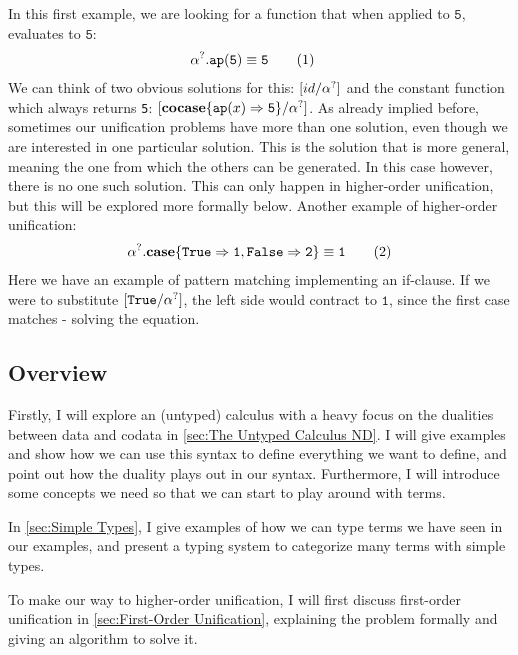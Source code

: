 \documentclass[twoside,12pt,a4paper]{article}
\begin{document}
\begin{example}\label{sec:mgu}
    In this first example, we are looking for a function that when applied to $\mathtt{5}$, evaluates to $\mathtt{5}$:
    \begin{align*}
        &\alpha^?.\texttt{ap}(\mathtt{5}) \equiv \mathtt{5}\tag{1} 
    \end{align*}
    We can think of two obvious solutions for this: $[id / \alpha^?]$ and the constant function which always returns \texttt{5}: $[\textbf{cocase}\{\texttt{ap}(x)\Rightarrow \mathtt{5}\} / \alpha^?]$.
    As already implied before, sometimes our unification problems have more than one solution, 
    even though we are interested in one particular solution. This is the solution that is more general, meaning the one from which the others can be generated.
    In this case however, there is no one such solution. This can only happen in higher-order unification, but this will be explored more formally below.
    Another example of higher-order unification:
    \begin{align*}
    \alpha^?.\textbf{case}\{\mathtt{True \Rightarrow 1, False \Rightarrow 2}\}\equiv \mathtt{1} \tag{2}
    \end{align*}
    Here we have an example of pattern matching implementing an if-clause.
    If we were to substitute $[\mathtt{True / \alpha^?}]$, the left side would contract to $\mathtt{1}$,
    since the first case matches - solving the equation.
\end{example}

\subsection{Overview}

Firstly, I will explore an (untyped) calculus with a heavy focus on the dualities between data and codata in \ref{sec:The Untyped Calculus ND}.
I will give examples and show how we can use this syntax to define everything we want to define, and point out how the duality plays out in our syntax.
Furthermore, I will introduce some concepts we need so that we can start to play around with terms.

In \ref{sec:Simple Types}, I give examples of how we can type terms we have seen in our examples, 
and present a typing system to categorize many terms with simple types.

To make our way to higher-order unification, I will first discuss first-order unification in \ref{sec:First-Order Unification},
explaining the problem formally and giving an algorithm to solve it.
\end{document}
